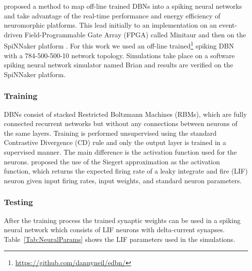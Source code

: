 \citet{10.3389/fnins.2013.00178} proposed a method to map off-line trained DBNs into a spiking neural networks and take advantage of the real-time performance and energy efficiency of neuromorphic platforms. This lead initially to an implementation on an event-driven Field-Programmable Gate Array (FPGA) called Minitaur \citep{dannminitaur} and then on the SpiNNaker platform \citep{iscasSpinnakerAcceptedDemo,SpinnakerDBN2015}. For this work we used an off-line trained\footnote{\url{https://github.com/dannyneil/edbn/}} spiking DBN with a 784-500-500-10 network topology. Simulations take place on a software spiking neural network simulator named Brian \citep{briansim} and results are verified on the SpiNNaker platform.

\subsubsection{Training}

DBNs consist of stacked Restricted Boltzmann Machines (RBMs), which are fully connected recurrent networks but without any connections between neurons of the same layers. Training is performed unsupervised using the standard Contrastive Divergence (CD) rule \citep{Hinton_Contr_Divergence2006} and only the output layer is trained in a supervised manner. The main difference is the activation function used for the neurons. \citet{10.3389/fnins.2013.00178} proposed the use of the Siegert approximation \citep{Jug_etal_2012} as the activation function, which returns the expected firing rate of a leaky integrate and fire (LIF) neuron given input firing rates, input weights, and standard neuron parameters.

\subsubsection{Testing}
After the training process the trained synaptic weights can be used in a spiking neural network which consists of LIF neurons with delta-current synapses. Table~\ref{Tab:NeuralParams} shows the LIF parameters used in the simulations.

